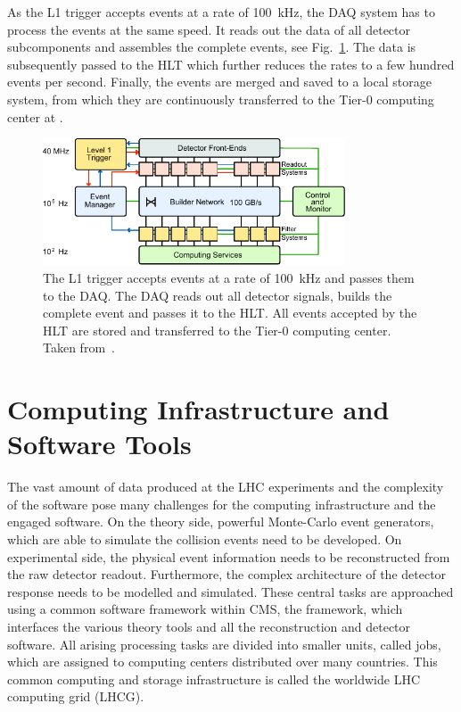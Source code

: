 As the L1 trigger accepts events at a rate of \SI{100}{\kilo\hertz}, the DAQ
system has to process the events at the same speed. It reads out the data of all
detector subcomponents and assembles the complete events, see
Fig.~\ref{fig:cms:daq_system}. The data is subsequently passed to the HLT  which
further reduces the rates to a few hundred events per second. Finally, the events are
merged and saved to a local storage system, from which they are continuously
transferred to the Tier-0 computing center at \CERN.

\begin{figure}[h!tp]
    \centering
    \includegraphics[width=0.8\textwidth]{figures/cms_detector/cms_daq_new.pdf}\hfill
    \caption[The DAQ System of CMS]{The L1 trigger accepts events at a rate of
        \SI{100}{\kilo\hertz} and passes them to the DAQ. The DAQ reads out
        all detector signals, builds the complete event and passes it to the
        HLT. All events accepted by the HLT are stored and transferred to the
        Tier-0 computing center. Taken from~\cite{Bayatian:922757}.}
    \label{fig:cms:daq_system}
\end{figure}

\section{Computing Infrastructure and Software Tools}

The vast amount of data produced at the LHC experiments and the complexity of
the software pose many challenges for the computing infrastructure and the
engaged software. On the theory side, powerful Monte-Carlo event generators,
which are able to simulate the collision events need to be developed. On
experimental side, the physical event information needs to be reconstructed from
the raw detector readout. Furthermore, the complex architecture of the detector
response needs to be modelled and simulated. These central tasks are approached
using a common software framework within CMS, the \CMSSW framework, which
interfaces the various theory tools and all the reconstruction and detector
software. All arising processing tasks are divided into smaller units, called
jobs, which are assigned to computing centers distributed over many countries.
This common computing and storage infrastructure is called the worldwide LHC
computing grid (LHCG).

